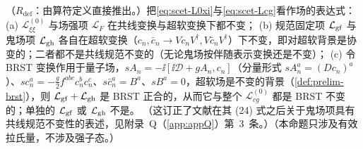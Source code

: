 \begin{proposition}\label{prop:scet-gauge}
（$R_{\mathrm{def}}$：由算符定义直接推出。）把\cref{eq:scet-L0xi}与\cref{eq:scet-Lcg}看作场的表达式：
(a) $\mathcal L^{(0)}_{\xi\xi}$ 与场强项 $\mathcal L_F$ 在共线变换与超软变换下都不变；
(b) 规范固定项 $\mathcal L_{\rm gf}$ 与鬼场项 $\mathcal L_{\rm gh}$ 各自在超软变换（$c_n,\bar c_n\to Vc_nV^\dagger,V\bar c_nV^\dagger$）下不变，即对超软背景是协变的；二者都不是共线规范不变的（无论鬼场按伴随表示变换还是不变）；
(c) 令 BRST 变换作用于量子场，$sA_n=-\ii[\ii\mathcal D+gA_n,c_n]$（分量形式 $sA^a_n=(Dc_n)^a$）、$sc_n^a=-\frac g2f^{abc}c_n^bc_n^c$、$s\bar c_n^a=B^a$、$sB^a=0$，超软场是不变的背景（\cref{def:prelim-brst}），则 $\mathcal L_{\rm gf}+\mathcal L_{\rm gh}$ 是 BRST 正合的，从而它与整个 $\mathcal L^{(0)}_{cg}$ 都是 BRST 不变的；单独的 $\mathcal L_{\rm gf}$ 或 $\mathcal L_{\rm gh}$ 不是。
（这订正了文献\cite{BauerPirjolStewart2002}在其 (24) 式之后关于鬼场项具有共线规范不变性的表述，见附录~Q（\cref{app:appQ}）第~3~条。）（本命题只涉及有效拉氏量，不涉及强子态。）
\end{proposition}

